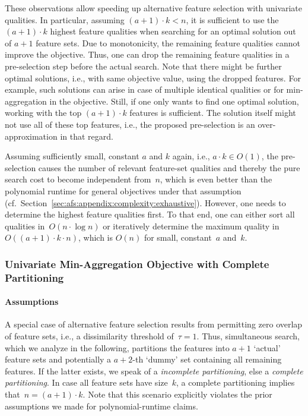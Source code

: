\documentclass{article}
\theoremstyle{definition}
\begin{document}
These observations allow speeding up alternative feature selection with univariate qualities.
In particular, assuming $(a + 1) \cdot k < n$, it is sufficient to use the $(a + 1) \cdot k$ highest feature qualities when searching for an optimal solution out of $a + 1$ feature sets.
Due to monotonicity, the remaining feature qualities cannot improve the objective.
Thus, one can drop the remaining feature qualities in a pre-selection step before the actual search.
Note that there might be further optimal solutions, i.e., with same objective value, using the dropped features.
For example, such solutions can arise in case of multiple identical qualities or for min-aggregation in the objective.
Still, if one only wants to find one optimal solution, working with the top $(a + 1) \cdot k$ features is sufficient.
The solution itself might not use all of these top features, i.e., the proposed pre-selection is an over-approximation in that regard.

Assuming sufficiently small, constant $a$ and $k$ again, i.e., $a \cdot k \in O(1)$, the pre-selection causes the number of relevant feature-set qualities and thereby the pure search cost to become independent from~$n$, which is even better than the polynomial runtime for general objectives under that assumption (cf.~Section~\ref{sec:afs:appendix:complexity:exhaustive}).
However, one needs to determine the highest feature qualities first.
To that end, one can either sort all qualities in~$O(n \cdot \log n)$ or iteratively determine the maximum quality in~$O((a+1) \cdot k \cdot n)$, which is $O(n)$ for small, constant~$a$ and~$k$.

\subsubsection{Univariate Min-Aggregation Objective with Complete Partitioning}
\label{sec:afs:appendix:complexity:uni-min-partitioning}

\paragraph{Assumptions}

A special case of alternative feature selection results from permitting zero overlap of feature sets, i.e., a dissimilarity threshold of~$\tau = 1$.
Thus, simultaneous search, which we analyze in the following, partitions the features into $a+1$ `actual' feature sets and potentially a $a+2$-th `dummy' set containing all remaining features.
If the latter exists, we speak of a \emph{incomplete partitioning}, else a \emph{complete partitioning}.
In case all feature sets have size~$k$, a complete partitioning implies that~$n = (a+1) \cdot k$.
Note that this scenario explicitly violates the prior assumptions we made for polynomial-runtime claims.
\end{document}
